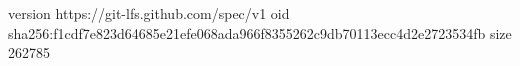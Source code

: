 version https://git-lfs.github.com/spec/v1
oid sha256:f1cdf7e823d64685e21efe068ada966f8355262c9db70113ecc4d2e2723534fb
size 262785
